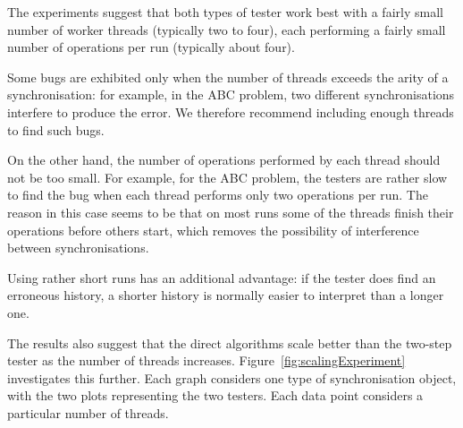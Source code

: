 %

The experiments suggest that both types of tester work best with a fairly
small number of worker threads (typically two to four), each performing a
fairly small number of operations per run (typically about four).

Some bugs are exhibited only when the number of threads exceeds the arity of a
synchronisation: for example, in the ABC problem, two different
synchronisations interfere to produce the error.
We therefore recommend including enough threads to
find such bugs.

On the other hand, the number of operations performed by each thread should
not be too small.  For example, for the ABC problem, the testers are rather
slow to find the bug when each thread performs only two operations per run.
The reason in this case seems to be that on most runs some of the threads
finish their operations before others start, which removes the possibility of
interference between synchronisations.

Using rather short runs has an additional advantage: if the tester does find
an erroneous history, a shorter history is normally easier to interpret than a
longer one.  



The results also suggest that the direct algorithms scale better than the
two-step tester as the number of threads increases.
Figure~\ref{fig:scalingExperiment} investigates this further.  Each graph
considers one type of synchronisation object, with the two plots representing
the two testers.  Each data point considers a particular number of threads.

